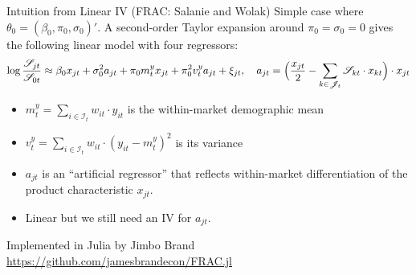\documentclass[aspectratio=169,10pt]{beamer}
\begin{document}
\begin{frame}{Intuition from Linear IV (FRAC: Salanie and Wolak)}
Simple case where $\theta_0 = (\beta_0, \pi_0, \sigma_0)'$. A second-order Taylor expansion around $\pi_0 = \sigma_0 = 0$ gives the following linear model with four regressors:
\begin{equation}
    \label{eq:frac}
    \log\frac{\mathscr{S}_{jt}}{\mathscr{S}_{0t}} \approx \beta_0 x_{jt} + \sigma_0^2 a_{jt} + \pi_0 m_t^y x_{jt} + \pi_0^2 v_t^y a_{jt} + \xi_{jt}, \quad a_{jt} = \Big(\frac{x_{jt}}{2} - \sum_{k \in \mathscr{J}_t} \mathscr{S}_{kt} \cdot x_{kt}\Big) \cdot x_{jt}
\end{equation}
\begin{itemize}
    \item $m_t^y = \sum_{i \in \mathcal{I}_t} w_{it} \cdot y_{it}$ is the within-market demographic mean
    \item $v_t^y = \sum_{i \in \mathcal{I}_t} w_{it} \cdot (y_{it} - m_t^y)^2$ is its variance
    \item $a_{jt}$ is an ``artificial regressor'' that reflects within-market differentiation of the product characteristic $x_{jt}$.\\
    \item Linear but we still need an IV for $a_{jt}$.
\end{itemize}
Implemented in Julia by Jimbo Brand  \url{https://github.com/jamesbrandecon/FRAC.jl}
\end{frame}
\end{document}
